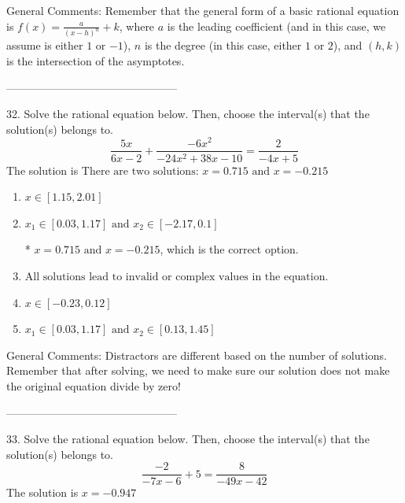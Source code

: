 \documentclass{article}[14pt]
\begin{document}
General Comments: Remember that the general form of a basic rational equation is $ f(x) = \frac{a}{(x-h)^n} + k$, where $a$ is the leading coefficient (and in this case, we assume is either $1$ or $-1$), $n$ is the degree (in this case, either $1$ or $2$), and $(h, k)$ is the intersection of the asymptotes.

-----------------------------------------------

32. Solve the rational equation below. Then, choose the interval(s) that the solution(s) belongs to.
$$ \frac{5x}{6x -2} + \frac{-6x^{2}}{-24x^{2} +38 x -10} = \frac{2}{-4x + 5} $$ 
The solution is $ \text{There are two solutions: } x = 0.715 \text{ and } x = -0.215 $ 

\begin{enumerate}[label=\Alph*.] 
\item $ x \in [1.15,2.01] $ 

  
\item $ x_1 \in [0.03, 1.17] \text{ and } x_2 \in [-2.17,0.1] $ 

 * $x = 0.715 \text{ and } x = -0.215$, which is the correct option. 
\item $ \text{All solutions lead to invalid or complex values in the equation.} $ 

  
\item $ x \in [-0.23,0.12] $ 

  
\item $ x_1 \in [0.03, 1.17] \text{ and } x_2 \in [0.13,1.45] $ 

  
\end{enumerate} 
 
General Comments: Distractors are different based on the number of solutions. Remember that after solving, we need to make sure our solution does not make the original equation divide by zero!

-----------------------------------------------

33. Solve the rational equation below. Then, choose the interval(s) that the solution(s) belongs to.
$$ \frac{-2}{-7x -6} + 5 = \frac{8}{-49x -42} $$ 
The solution is $ x = -0.947 $ 
\end{document}
